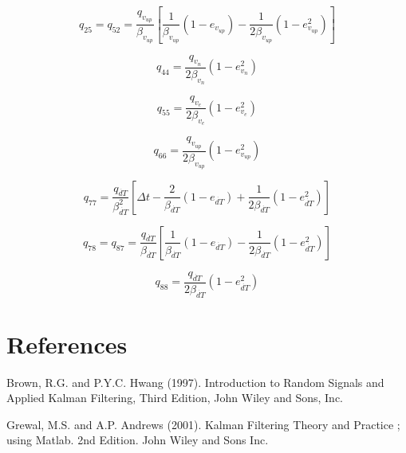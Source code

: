 \documentclass[11pt,letterpaper]{article}
\begin{document}
\begin{equation} \label{eq:q36}
q_{25} = q_{52} = \frac{q_{v_{up}}}{\beta_{v_{up}}} [ \frac{1}{\beta_{v_{up}}}(1 - e_{v_{up}}) - \frac{1}{2 \beta_{v_{up}}}(1 - e_{v_{up}}^2)]
\end{equation}


\begin{equation} \label{eq:q44}
q_{44} = \frac{q_{v_n}}{2 \beta_{v_n}} ( 1 - e_{v_n}^2 )
\end{equation}

\begin{equation} \label{eq:q55}
q_{55} = \frac{q_{v_e}}{2 \beta_{v_e}} ( 1 - e_{v_e}^2 )
\end{equation}

\begin{equation} \label{eq:q66}
q_{66} = \frac{q_{v_{up}}}{2 \beta_{v_{up}}} ( 1 - e_{v_{up}}^2 )
\end{equation}


\begin{equation} \label{eq:q77}
q_{77} = \frac{q_{\dot{dT}}}{\beta_{\dot{dT}}^2} [\Delta t - \frac{2}{\beta_{\dot{dT}}}(1 - e_{\dot{dT}}) + \frac{1}{2 \beta_{\dot{dT}}}(1 - e_{\dot{dT}}^2)]
\end{equation}

\begin{equation} \label{eq:q14}
q_{78} = q_{87} = \frac{q_{\dot{dT}}}{\beta_{\dot{dT}}} [ \frac{1}{\beta_{\dot{dT}}}(1 - e_{\dot{dT}}) - \frac{1}{2 \beta_{\dot{dT}}}(1 - e_{\dot{dT}}^2)]
\end{equation}

\begin{equation} \label{eq:q44}
q_{88} = \frac{q_{\dot{dT}}}{2 \beta_{\dot{dT}}} ( 1 - e_{\dot{dT}}^2 )
\end{equation}



\section{References}

Brown, R.G. and P.Y.C. Hwang (1997). Introduction to Random Signals and Applied Kalman Filtering, Third Edition, John Wiley and Sons, Inc.

Grewal, M.S. and A.P. Andrews (2001). Kalman Filtering Theory and Practice ; using Matlab. 2nd Edition. John Wiley and Sons Inc.
\end{document}
